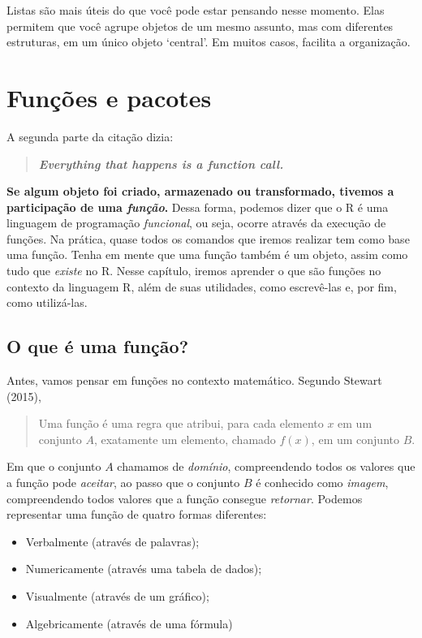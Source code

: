 \documentclass[
  letterpaper,
  DIV=11,
  numbers=noendperiod]{scrreprt}
\begin{document}
Listas são mais úteis do que você pode estar pensando nesse momento.
Elas permitem que você agrupe objetos de um mesmo assunto, mas com
diferentes estruturas, em um único objeto `central'. Em muitos casos,
facilita a organização.

\chapter{Funções e pacotes}\label{funuxe7uxf5es-e-pacotes}

A segunda parte da citação dizia:

\begin{quote}
\textbf{\emph{Everything that happens is a function call.}}
\end{quote}

\textbf{Se algum objeto foi criado, armazenado ou transformado, tivemos
a participação de uma \emph{função}.} Dessa forma, podemos dizer que o R
é uma linguagem de programação \emph{funcional}, ou seja, ocorre através
da execução de funções. Na prática, quase todos os comandos que iremos
realizar tem como base uma função. Tenha em mente que uma função também
é um objeto, assim como tudo que \emph{existe} no R. Nesse capítulo,
iremos aprender o que são funções no contexto da linguagem R, além de
suas utilidades, como escrevê-las e, por fim, como utilizá-las.

\section{O que é uma função?}\label{o-que-uxe9-uma-funuxe7uxe3o}

Antes, vamos pensar em funções no contexto matemático. Segundo Stewart
(2015),

\begin{quote}
Uma função é uma regra que atribui, para cada elemento \(x\) em um
conjunto \(A\), exatamente um elemento, chamado \(f(x)\), em um conjunto
\(B\).
\end{quote}

Em que o conjunto \(A\) chamamos de \emph{domínio}, compreendendo todos
os valores que a função pode \emph{aceitar}, ao passo que o conjunto
\(B\) é conhecido como \emph{imagem}, compreendendo todos valores que a
função consegue \emph{retornar}. Podemos representar uma função de
quatro formas diferentes:

\begin{itemize}
\item
  Verbalmente (através de palavras);
\item
  Numericamente (através uma tabela de dados);
\item
  Visualmente (através de um gráfico);
\item
  Algebricamente (através de uma fórmula)
\end{itemize}
\end{document}
